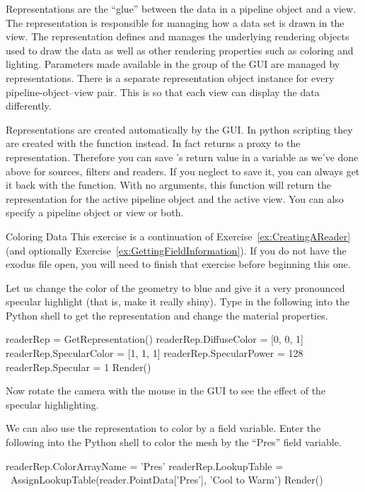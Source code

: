 Representations are the ``glue'' between the data in a pipeline object and
a view.  The representation is responsible for managing how a data set is
drawn in the view.  The representation defines and manages the underlying
rendering objects used to draw the data as well as other rendering
properties such as coloring and lighting.  Parameters made available in the
 group of the GUI are managed by representations.  There is a
separate representation object instance for every pipeline-object--view
pair.  This is so that each view can display the data differently.

Representations are created automatically by the GUI. In python scripting
they are created with the  function instead.
In fact  returns a proxy to the
representation.
Therefore you can save 's return value in a variable as we've
done above for sources, filters and readers.
If you neglect to save it, you can always get it back with the
 function.  With no arguments, this function will
return the representation for the active pipeline object and the active
view.  You can also specify a pipeline object or view or both.

\begin{exercise}{Coloring Data}
  \label{ex:ColoringData}%
  This exercise is a continuation of Exercise~\ref{ex:CreatingAReader} (and
  optionally Exercise~\ref{ex:GettingFieldInformation}).  If you do not
  have the exodus file open, you will need to finish that exercise before
  beginning this one.

  Let us change the color of the geometry to blue and give it a very
  pronounced specular highlight (that is, make it
  really shiny).  Type in the following into the Python shell
  to get the representation and change the material properties.

  \begin{python}
readerRep = GetRepresentation()
readerRep.DiffuseColor = [0, 0, 1]
readerRep.SpecularColor = [1, 1, 1]
readerRep.SpecularPower = 128
readerRep.Specular = 1
Render()
  \end{python}

  Now rotate the camera with the mouse in the GUI to see the effect of the
  specular highlighting.

  We can also use the representation to color by a field variable.  Enter
  the following into the Python shell to color the mesh by the ``Pres''
  field variable.

  \begin{python}
readerRep.ColorArrayName = 'Pres'
readerRep.LookupTable = \
  AssignLookupTable(reader.PointData['Pres'], 'Cool to Warm')
Render()
  \end{python}
\end{exercise}

